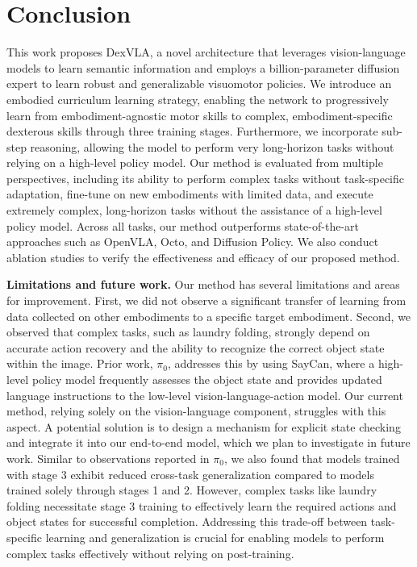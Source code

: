 \section{Conclusion}
This work proposes DexVLA, a novel architecture that leverages vision-language models to learn semantic information and employs a billion-parameter diffusion expert to learn robust and generalizable visuomotor policies. We introduce an embodied curriculum learning strategy, enabling the network to progressively learn from embodiment-agnostic motor skills to complex, embodiment-specific dexterous skills through three training stages.  Furthermore, we incorporate sub-step reasoning, allowing the model to perform very long-horizon tasks without relying on a high-level policy model. Our method is evaluated from multiple perspectives, including its ability to perform complex tasks without task-specific adaptation, fine-tune on new embodiments with limited data, and execute extremely complex, long-horizon tasks without the assistance of a high-level policy model.  Across all tasks, our method outperforms state-of-the-art approaches such as OpenVLA, Octo, and Diffusion Policy. We also conduct ablation studies to verify the effectiveness and efficacy of our proposed method.


\textbf{Limitations and future work.} Our method has several limitations and areas for improvement. First, we did not observe a significant transfer of learning from data collected on other embodiments to a specific target embodiment. Second, we observed that complex tasks, such as laundry folding, strongly depend on accurate action recovery and the ability to recognize the correct object state within the image. Prior work, $\pi_{0}$, addresses this by using SayCan, where a high-level policy model frequently assesses the object state and provides updated language instructions to the low-level vision-language-action model. Our current method, relying solely on the vision-language component, struggles with this aspect. A potential solution is to design a mechanism for explicit state checking and integrate it into our end-to-end model, which we plan to investigate in future work. Similar to observations reported in $\pi_{0}$, we also found that models trained with stage 3 exhibit reduced cross-task generalization compared to models trained solely through stages 1 and 2. However, complex tasks like laundry folding necessitate stage 3 training to effectively learn the required actions and object states for successful completion. Addressing this trade-off between task-specific learning and generalization is crucial for enabling models to perform complex tasks effectively without relying on post-training. 

